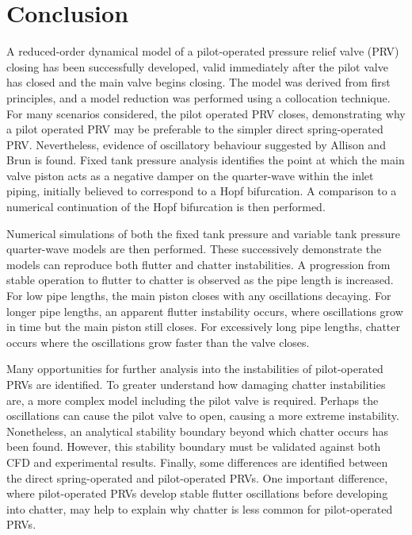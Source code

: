 \chapter{Conclusion}

A reduced-order dynamical model of a pilot-operated pressure relief valve (PRV) closing has been successfully developed, valid immediately after the pilot valve has closed and the main valve begins closing. The model was derived from first principles, and a model reduction was performed using a collocation technique. For many scenarios considered, the pilot operated PRV closes, demonstrating why a pilot operated PRV may be preferable to the simpler direct spring-operated PRV. Nevertheless, evidence of oscillatory behaviour suggested by Allison and Brun \cite{Allison2015TestingValves} is found. Fixed tank pressure analysis identifies the point at which the main valve piston acts as a negative damper on the quarter-wave within the inlet piping, initially believed to correspond to a Hopf bifurcation. A comparison to a numerical continuation of the Hopf bifurcation is then performed.

Numerical simulations of both the fixed tank pressure and variable tank pressure quarter-wave models are then performed. These successively demonstrate the models can reproduce both flutter and chatter instabilities. A progression from stable operation to flutter to chatter is observed as the pipe length is increased. For low pipe lengths, the main piston closes with any oscillations decaying. For longer pipe lengths, an apparent flutter instability occurs, where oscillations grow in time but the main piston still closes. For excessively long pipe lengths, chatter occurs where the oscillations grow faster than the valve closes.

Many opportunities for further analysis into the instabilities of pilot-operated PRVs are identified. To greater understand how damaging chatter instabilities are, a more complex model including the pilot valve is required. Perhaps the oscillations can cause the pilot valve to open, causing a more extreme instability. Nonetheless, an analytical stability boundary beyond which chatter occurs has been found. However, this stability boundary must be validated against both CFD and experimental results. Finally, some differences are identified between the direct spring-operated and pilot-operated PRVs. One important difference, where pilot-operated PRVs develop stable flutter oscillations before developing into chatter, may help to explain why chatter is less common for pilot-operated PRVs.